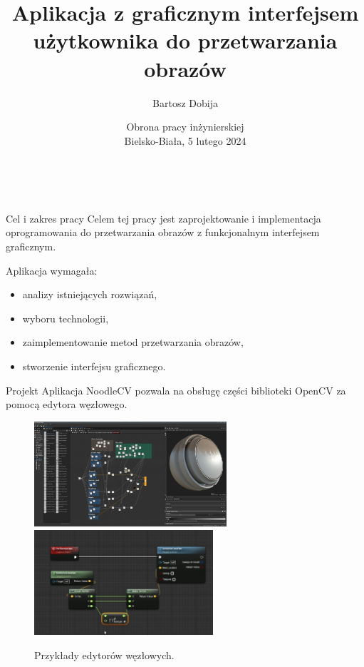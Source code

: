 \documentclass[aspectratio=1610,handout]{beamer}
\title{Aplikacja z graficznym interfejsem użytkownika do przetwarzania obrazów}
\author[Bartosz Dobija]{Bartosz Dobija}
\institute{Uniwersytet Bielsko-Bialski\\ Wydział Budowy Maszyn i Informatyki}
\date[5 lutego 2024]{Obrona pracy inżynierskiej \\ Bielsko-Biała, 5 lutego 2024}
\theoremstyle{definition}
\begin{document}
\begin{frame}{$ $}
    \titlepage
\end{frame}

\begin{frame}{Cel i zakres pracy}
    Celem tej pracy jest zaprojektowanie i implementacja oprogramowania do przetwarzania obrazów z funkcjonalnym interfejsem graficznym.
    \vspace{1cm}

    Aplikacja wymagała:
    \begin{itemize}
        \item analizy istniejących rozwiązań,
        \item wyboru technologii,
        \item zaimplementowanie metod przetwarzania obrazów,
        \item stworzenie interfejsu graficznego.
    \end{itemize}
\end{frame}

\begin{frame}{Projekt}
    Aplikacja NoodleCV pozwala na obsługę części biblioteki OpenCV za pomocą edytora węzłowego.

    \begin{figure}
            \includegraphics[height=3.9cm]{./imgs/substance.jpg}%
            \hfil
            \includegraphics[height=3.9cm]{./imgs/unreal.JPG}
            \caption{Przykłady edytorów węzłowych.}
    \end{figure}

\end{frame}
\end{document}
